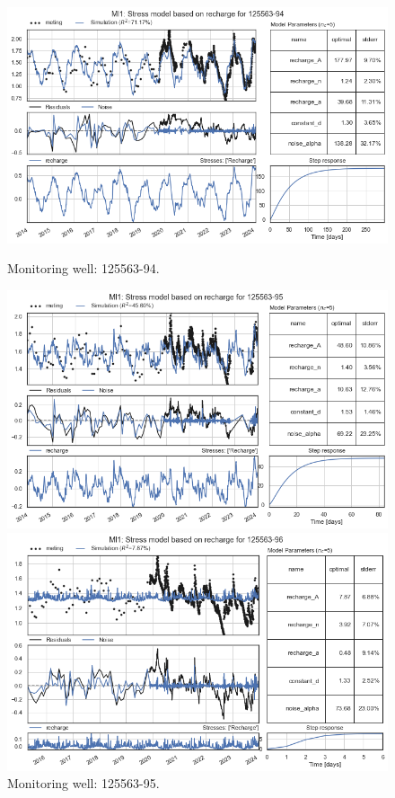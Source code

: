 \begin{figure}[htbp]
    \centering
    \begin{minipage}{0.32\textwidth}
        \centering
        \includegraphics[width=\linewidth]{frontmatter/Heijplaat-fig/4.png}
        \caption{Monitoring well: 125563-94.}
        \label{SM:125563-94}
    \end{minipage}
    \hfill
    \begin{minipage}{0.32\textwidth}
        \centering
        \includegraphics[width=\linewidth]{frontmatter/Heijplaat-fig/5.png}
        \caption{Monitoring well: 125563-95.}
        \label{SM: 125563-95}
    \end{minipage}
    \hfill
    \begin{minipage}{0.32\textwidth}
        \centering
        \includegraphics[width=\linewidth]{frontmatter/Heijplaat-fig/6.png}

\end{minipage}
\end{figure}
